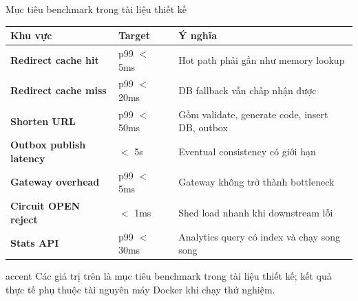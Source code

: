 \documentclass[aspectratio=169]{beamer}
\begin{document}
\begin{frame}{Mục tiêu benchmark trong tài liệu thiết kế}
    \scriptsize
    \begin{center}
    \begin{tabular}{>{\bfseries}p{}p{}p{}}
        \toprule
        Khu vực & Target & Ý nghĩa \\
        \midrule
        Redirect cache hit & p99 $<$ 5ms & Hot path phải gần như memory lookup \\
        Redirect cache miss & p99 $<$ 20ms & DB fallback vẫn chấp nhận được \\
        Shorten URL & p99 $<$ 50ms & Gồm validate, generate code, insert DB, outbox \\
        Outbox publish latency & $<$ 5s & Eventual consistency có giới hạn \\
        Gateway overhead & p99 $<$ 5ms & Gateway không trở thành bottleneck \\
        Circuit OPEN reject & $<$ 1ms & Shed load nhanh khi downstream lỗi \\
        Stats API & p99 $<$ 30ms & Analytics query có index và chạy song song \\
        \bottomrule
    \end{tabular}
    \end{center}
    \vspace{0.25cm}
    \begin{claimbox}{accent}
        \small Các giá trị trên là mục tiêu benchmark trong tài liệu thiết kế; kết quả thực tế phụ thuộc tài nguyên máy Docker khi chạy thử nghiệm.
    \end{claimbox}
\end{frame}
\end{document}
